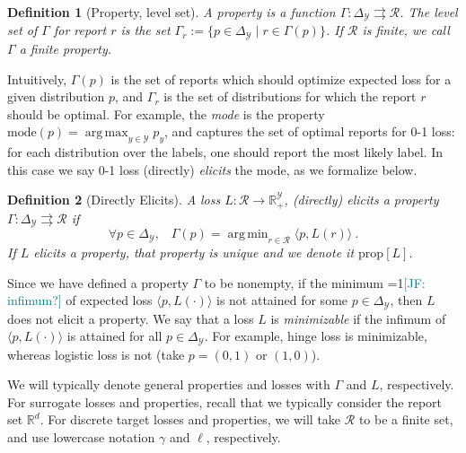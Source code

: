 \documentclass[11pt]{article}
\newcommand{\Comments}{1}
\newcommand{\mynote}[2]{\ifnum\Comments=1\textcolor{#1}{#2}\fi}
\newcommand{\mytodo}[2]{\ifnum\Comments=1%
  \todo[linecolor=#1!80!black,backgroundcolor=#1,bordercolor=#1!80!black]{#2}\fi}
\newcommand{\raft}[1]{\mytodo{green!20!white}{RF: #1}}
\newcommand{\jessie}[1]{\mynote{teal}{[JF: #1]}}
\newcommand{\jessiet}[1]{\mytodo{teal!20!white}{JF: #1}}
\newcommand{\reals}{\mathbb{R}}
\newcommand{\prop}[1]{\mathrm{prop}[#1]}
\newcommand{\mode}{\mathrm{mode}}
\newcommand{\simplex}{\Delta_\Y}
\newcommand{\R}{\mathcal{R}}
\newcommand{\Y}{\mathcal{Y}}
\newcommand{\inprod}[2]{\langle #1, #2 \rangle}%
\newcommand{\toto}{\rightrightarrows}
\DeclareMathOperator*{\argmax}{arg\,max}
\DeclareMathOperator*{\argmin}{arg\,min}
\newtheorem{definition}{Definition}
\begin{document}
\begin{definition}[Property, level set]\label{def:property}
  A \emph{property} is a function $\Gamma:\simplex\toto\R$.
  The \emph{level set} of $\Gamma$ for report $r$ is the set $\Gamma_r := \{p \in \simplex \mid r \in \Gamma(p)\}$.
  If $\R$ is finite, we call $\Gamma$ a \emph{finite property}.
\end{definition}

Intuitively, $\Gamma(p)$ is the set of reports which should optimize expected loss for a given distribution $p$, and $\Gamma_r$ is the set of distributions for which the report $r$ should be optimal.
For example, the \emph{mode} is the %
property $\mode(p) = \argmax_{y\in\Y} p_y$, and captures the set of optimal reports for 0-1 loss: for each distribution over the labels, one should report the most likely label.
In this case we say 0-1 loss (directly) \emph{elicits} the mode, as we formalize below.

\begin{definition}[Directly Elicits]
  \label{def:elicits}
  A loss $L:\R\to\reals^\Y_+$, \emph{(directly) elicits} a property $\Gamma:\simplex \toto \R$ if
  \begin{equation}
    \forall p\in\simplex,\;\;\;\Gamma(p) = \argmin_{r \in \R} \inprod{p}{L(r)}~.
  \end{equation}
  If $L$ elicits a property, that property is unique and we denote it $\prop{L}$.
\end{definition}
Since we have defined a property $\Gamma$ to be nonempty, if the minimum \jessie{infimum?} of expected loss $\inprod{p}{L(\cdot)}$ is not attained for some $p \in \simplex$, then $L$ does not elicit a property.
We say that a loss $L$ is \emph{minimizable} if the infimum of $\inprod{p}{L(\cdot)}$ is attained for all $p \in \simplex$.
For example, hinge loss is minimizable, whereas logistic loss is not (take $p=(0,1)$ or $(1,0)$).

We will typically denote general properties and losses with $\Gamma$ and $L$, respectively.
For surrogate losses and properties, recall that we typically consider the report set $\reals^d$.
For discrete target losses and properties, we will take $\R$ to be a finite set, and use lowercase notation $\gamma$ and $\ell$, respectively.
\end{document}
